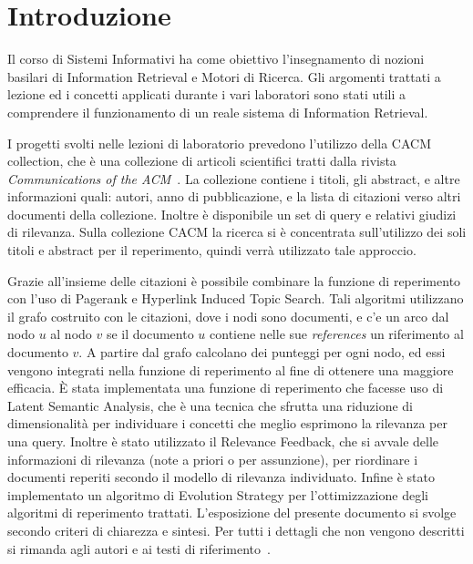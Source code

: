 \section{Introduzione}
\label{sec:introduzione}

Il corso di Sistemi Informativi ha come obiettivo l'insegnamento di nozioni basilari di Information Retrieval e Motori di Ricerca. Gli argomenti trattati a lezione ed i concetti applicati durante i vari laboratori sono stati utili a comprendere il funzionamento di un reale sistema di Information Retrieval.

I progetti svolti nelle lezioni di laboratorio prevedono l'utilizzo della CACM collection, che \`e una collezione di articoli scientifici tratti dalla rivista \textit{Communications of the ACM}~\cite{ACMCollection}. La collezione contiene i titoli, gli abstract, e altre informazioni quali: autori, anno di pubblicazione, e la lista di citazioni verso altri documenti della collezione. Inoltre \`e disponibile un set di query e relativi giudizi di rilevanza. Sulla collezione CACM la ricerca si \`e concentrata sull'utilizzo dei soli titoli e abstract per il reperimento, quindi verr\`a utilizzato tale approccio. 

Grazie all'insieme delle citazioni \`e possibile combinare la funzione di reperimento con l'uso di Pagerank e Hyperlink Induced Topic Search. Tali algoritmi utilizzano il grafo costruito con le citazioni, dove i nodi sono  documenti, e c'e un arco dal nodo $u$ al nodo $v$ se il documento $u$ contiene nelle sue \textit{references} un riferimento al documento $v$. A partire dal grafo calcolano dei punteggi per ogni nodo, ed essi vengono integrati nella funzione di reperimento al fine di ottenere una maggiore efficacia. 
\`E stata implementata una funzione di reperimento che facesse uso di Latent Semantic Analysis, che \`e una tecnica che sfrutta una riduzione di dimensionalit\`a per individuare i concetti che meglio esprimono la rilevanza per una query. Inoltre \`e stato utilizzato il Relevance Feedback, che si avvale delle informazioni di rilevanza (note a priori o per assunzione), per riordinare i documenti reperiti secondo il modello di rilevanza individuato.
Infine \`e stato implementato un algoritmo di Evolution Strategy per l'ottimizzazione degli algoritmi di reperimento trattati. L'esposizione del presente documento si svolge secondo criteri di chiarezza e sintesi. Per tutti i dettagli che non vengono descritti si rimanda agli autori e ai testi di riferimento~\cite{manning2008introduction,melucci2013information,croft2010search}.
